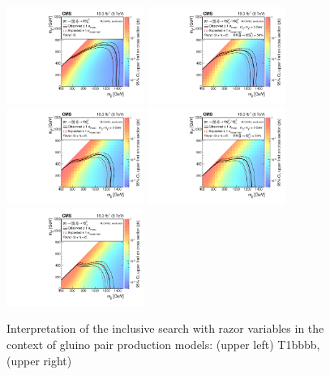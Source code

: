 \begin{figure}[t]
\centering
\includegraphics[width=0.4\textwidth]{figs/analysis8TeV/T1bbbbHybridNew0LXSEC.pdf}
\includegraphics[width=0.4\textwidth]{figs/analysis8TeV/T1tbbbHybridNew0Lp1Lp2LXSEC.pdf}
\includegraphics[width=0.4\textwidth]{figs/analysis8TeV/T1ttbbHybridNew0Lp1Lp2LXSEC.pdf}
\includegraphics[width=0.4\textwidth]{figs/analysis8TeV/T1tttbHybridNew0Lp1Lp2LXSEC.pdf}
\includegraphics[width=0.4\textwidth]{figs/analysis8TeV/T1ttttHybridNew0Lp1Lp2LXSEC.pdf}
\caption{Interpretation of the inclusive search with razor variables
  in the context of gluino pair production models: (upper left) T1bbbb, (upper right)
}
\end{figure}
